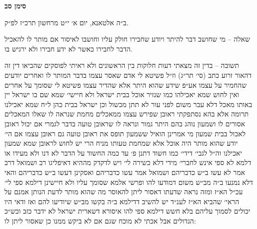 \documentclass[12pt, openany]{book}
\newcommand{\chapname}{}
\newcommand{\newchap}[1]{
	\addcontentsline{toc}{chapter}{#1}
	\renewcommand{\chapname}{#1}
		\begin{center}
			\textbf{%
\fontsize{16pt}{16pt}\selectfont
				#1}
		\end{center}
}
\begin{document}
\newchap{סימן סב}
\begin{multicols}{2}
ב״ה אלטאנא, יום א׳ י״ט מרחשון תרכ״ז לפ״ק.\\\vspace{0pt}

שאלה – מי שחושב דבר להיתר ויודע שחבירו חולק עליו וחושבו לאיסור אם מותר לו להאכיל הדבר לחבירו כאשר לא ידע חבירו ולא ירגיש בו.\\\vspace{0pt}

תשובה – בדין זה מצאתי דעות חלוקות בין הראשונים ולא ראיתי לפוסקים שהביאו דין זה דהאור זרוע כתב (סי׳ תר״ג) וז״ל פשיטא לי אדם שאסר עצמו בדבר המותר לו ואחרים יודעים שהחמיר על עצמו אע״פ שידע שהוא היתר אלא שהדיר עצמו פשיטא לי שסומך על אחרים ואין לחוש שמא יאכילהו כמו שנזיר אוכל בבית ישראל ולא חיישי׳ שמא שם בו ישראל יין באותו מאכל דלא עבר משום לפני עור לא תתן מכשול וכן ישראל בבית כהן ל״ח שמא יאכילנו תרומה אלא בהא נסתפקתי ראובן שפירש עצמו ממאכלים מחמת שנראה לו שאלו המאכלים אסורים לו ושמעון נוהג בהם היתר גמור ונראה לו שראובן טועה בדבר לגמרי אם יכול ראובן לאכול בבית שמעון מי אמרינן הואיל ששמעון תופס את ראובן טועה גם ראובן עצמו אם הי׳ יודע שהוא מותר היה אוכל אלא שמחמת טעותו מניח הרי יש לחוש לראובן שמא שמעון יאכילנו וה״ל לגבי׳ דידי׳ כמו חשוד דתנן פ׳ עד כמה החשוד על הדבר לא דנו ולא מעידו או דלמא לא ספי אינש לחברי׳ מידי דלא כשירה לי׳ ויש לדקדק מההיא דאיפליגו רב ושמואל דרב אמר לא עשו ב״ש כדבריהם ושמואל אמר עשו כדבריהם ואסקינן דעשו ב״ש כדבריהם והאי דלא נמנעו ב״ה מב״ש משום דמודעו להו ופרשי אלמא שסומך עליו ולא חיישינן דילמא ספי לי׳ עכ״ל הא״ז ומזה נראה שדעתו דאסור ליתן להאוסר מה שהוא מותר לדעת הנותן אמנם על הראי׳ שהביא הא״ז לענ״ד יש להשיב דדילמא ב״ה בקשו מב״ש שיודיעו להם ואז ודאי היו יכולים לסמוך עליהם בלא חשש דילמא ספי להו איסורא דשארית ישראל לא ידבר כזב וכש״כ הגדולים אבל אכתי לא מוכח שגם אם לא ביקש ממנו כן שאסור ליתן לו:\\\vspace{0pt}


\end{multicols}
\end{document}
